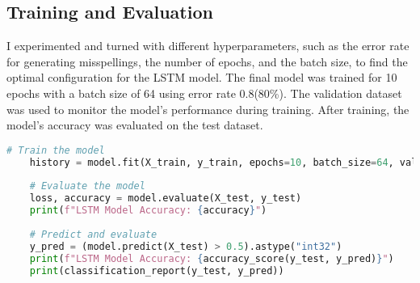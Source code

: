 \subsection{Training and Evaluation}
I experimented and turned with different hyperparameters, such as the error rate for generating misspellings, the number of epochs, and the batch size, to find the optimal configuration for the LSTM model. The final model was trained for 10 epochs with a batch size of 64 using error rate 0.8(80\%). The validation dataset was used to monitor the model's performance during training. After training, the model's accuracy was evaluated on the test dataset.
\begin{lstlisting}[language=Python, caption=Data Collection and Preprocessing]
    # Train the model
    history = model.fit(X_train, y_train, epochs=10, batch_size=64, validation_data=(X_test, y_test))
    
    # Evaluate the model
    loss, accuracy = model.evaluate(X_test, y_test)
    print(f"LSTM Model Accuracy: {accuracy}")
    
    # Predict and evaluate
    y_pred = (model.predict(X_test) > 0.5).astype("int32")
    print(f"LSTM Model Accuracy: {accuracy_score(y_test, y_pred)}")
    print(classification_report(y_test, y_pred))
    
\end{lstlisting}

